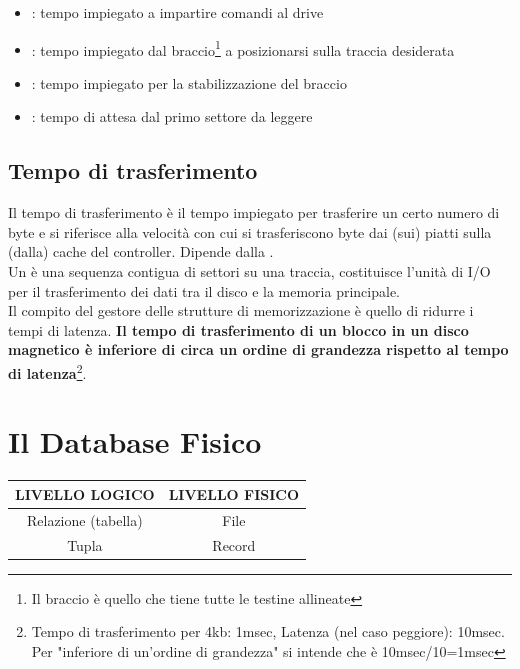 \documentclass[12pt, a4paper]{report}
\begin{document}
    \begin{itemize}
        \item {}: tempo impiegato a impartire comandi al drive
        \item {}: tempo impiegato dal braccio\footnote{Il braccio è quello che tiene tutte le testine allineate} a posizionarsi sulla traccia desiderata
        \item {}: tempo impiegato per la stabilizzazione del braccio
        \item {}: tempo di attesa dal primo settore da leggere
    \end{itemize}
    \subsection{Tempo di trasferimento}
    Il tempo di trasferimento è il tempo impiegato per trasferire un certo numero di byte e si riferisce alla velocità con cui si trasferiscono byte dai (sui) piatti sulla (dalla) cache del controller. Dipende dalla .\\
    Un  è una sequenza contigua di settori su una traccia, costituisce l'unità di I/O per il trasferimento dei dati tra il disco e la memoria principale.\\
    Il compito del gestore delle strutture di memorizzazione è quello di ridurre i tempi di latenza.
    \textbf{Il tempo di trasferimento di un blocco in un disco magnetico è inferiore di circa un ordine di grandezza rispetto al tempo di latenza}\footnote{Tempo di trasferimento per 4kb: 1msec, Latenza (nel caso peggiore): 10msec. Per "inferiore di un'ordine di grandezza" si intende che è 10msec/10=1msec}.
    \section{Il Database Fisico}
    \begin{center}
        \begin{tabular}{| c | c |}
            \hline
            \textbf{LIVELLO LOGICO} & \textbf{LIVELLO FISICO}\\
            \hline
            Relazione (tabella) & File\\
            \hline
            Tupla & Record\\
            \hline
        \end{tabular}
    \end{center}
\end{document}
